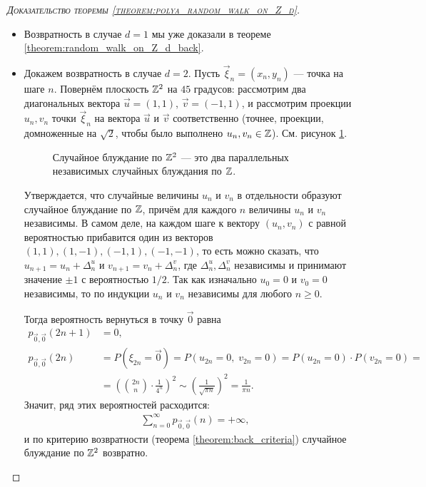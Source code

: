 \documentclass[../main.tex]{subfiles}
\begin{document}
 \begin{proof}[\normalfont\textsc{Доказательство теоремы \ref{theorem:polya_random_walk_on_Z_d}}]\
  \begin{itemize}
   \item Возвратность в случае $ d=1 $ мы уже доказали в теореме \ref{theorem:random_walk_on_Z_d_back}.
   \item Докажем возвратность в случае $ d = 2 $. Пусть $ \vec\xi_n = (x_n, y_n) $ --- точка на шаге $ n $. Повернём плоскость $ \mathbb{Z}^{2} $ на $ 45 $ градусов: рассмотрим два диагональных вектора $ \vec u = (1, 1) $, $ \vec v = (-1, 1) $, и рассмотрим проекции $ u_n, v_n $ точки $ \vec\xi_n $ на вектора $ \vec u $ и $ \vec v $ соответственно (точнее, проекции, домноженные на $ \sqrt 2 $, чтобы было выполнено $ u_n,v_n \in \mathbb{Z} $). См. рисунок \ref{fig:random_walk_on_z2}.

    \begin{figure}[ht]
     \centering
     \caption{Случайное блуждание по $ \mathbb{Z}^{2} $ --- это два параллельных независимых случайных блуждания по $ \mathbb{Z} $.}
     \label{fig:random_walk_on_z2}
    \end{figure}

    Утверждается, что случайные величины $ u_n $ и $ v_n $ в отдельности образуют случайное блуждание по $ \mathbb{Z} $, причём для каждого $ n $ величины $ u_n $ и $ v_n $ независимы. В самом деле, на каждом шаге к вектору $ (u_n, v_n) $ с равной вероятностью прибавится один из векторов $ (1,1), (1,-1), (-1, 1), (-1, -1) $, то есть можно сказать, что $ u_{n+1} = u_n + \Delta^{u}_n$ и $ v_{n+1} = v_n + \Delta^{v}_n $, где $ \Delta^{u}_n, \Delta^{v}_n $ независимы и принимают значение $ \pm 1 $ с вероятностью $ 1 / 2 $. Так как изначально $ u_0 = 0 $ и $ v_0 = 0 $ независимы, то по индукции $ u_n $ и $ v_n $ независимы для любого $ n \geqslant 0 $.

    Тогда вероятность вернуться в точку $ \vec 0 $ равна
    \begin{align*}
     p_{\vec 0, \vec 0}(2n + 1) &= 0,\\
     p_{\vec 0, \vec 0}(2n) &= P(\xi_{2n} = \vec 0) = P(u_{2n} = 0,\;v_{2n} = 0) = P(u_{2n} = 0) \cdot P(v_{2n} = 0) = \\
     &= \left( \binom {2n}{n} \cdot \frac{1}{4^{n}} \right)^{2} \sim \left( \frac{1}{\sqrt{\pi n}} \right)^{2} = \frac{1}{\pi n}.
    \end{align*} Значит, ряд этих вероятностей расходится:
    \begin{align*}
     \sum_{n=0}^{\infty}p_{\vec 0, \vec 0}(n) = +\infty,
    \end{align*} и по критерию возвратности (теорема \ref{theorem:back_criteria}) случайное блуждание по $ \mathbb{Z}^{2} $ возвратно.


\end{itemize}
\end{proof}
\end{document}
